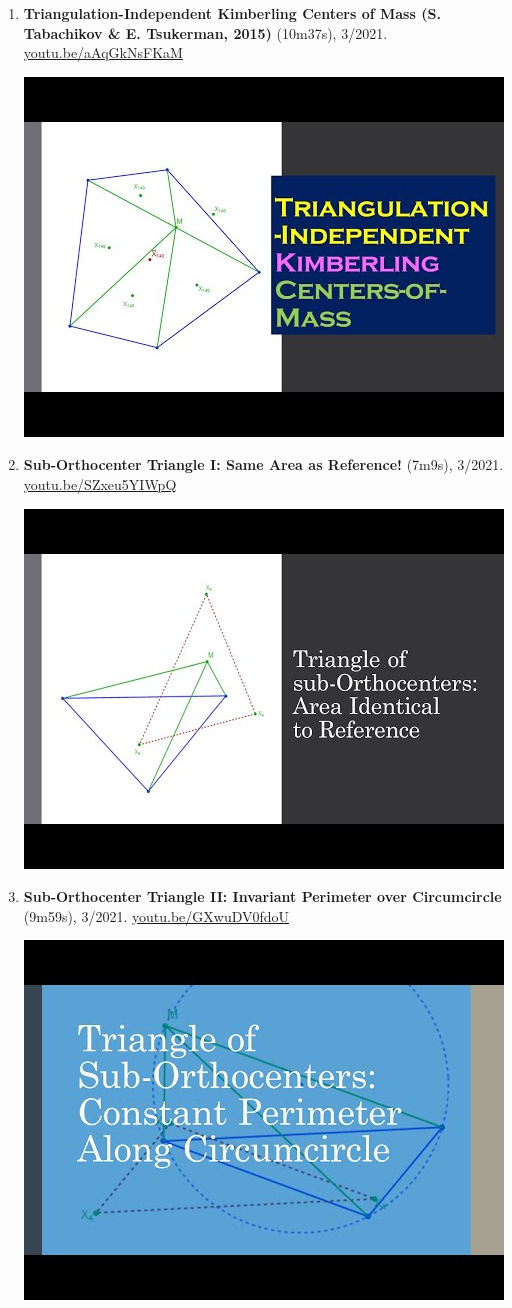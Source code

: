 \documentclass[12pt]{article}
\begin{document}
\begin{enumerate}[resume]
\item \textbf{Triangulation-Independent Kimberling Centers of Mass (S. Tabachikov \& E. Tsukerman, 2015)} (10m37s), 3/2021. \href{https://youtu.be/aAqGkNsFKaM}{\url{youtu.be/aAqGkNsFKaM}}
\begin{center}\includegraphics[width=.5\textwidth]{pics/aAqGkNsFKaM.jpg}\end{center}
% 
\item \textbf{Sub-Orthocenter Triangle I: Same Area as Reference!} (7m9s), 3/2021. \href{https://youtu.be/SZxeu5YIWpQ}{\url{youtu.be/SZxeu5YIWpQ}}
\begin{center}\includegraphics[width=.5\textwidth]{pics/SZxeu5YIWpQ.jpg}\end{center}
% 
\item \textbf{Sub-Orthocenter Triangle II: Invariant Perimeter over Circumcircle} (9m59s), 3/2021. \href{https://youtu.be/GXwuDV0fdoU}{\url{youtu.be/GXwuDV0fdoU}}
\begin{center}\includegraphics[width=.5\textwidth]{pics/GXwuDV0fdoU.jpg}\end{center}

\end{enumerate}
\end{document}
